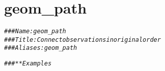 \documentclass[a4paper,titlepage]{tufte-handout}\usepackage[]{graphicx}\usepackage[]{color}
\makeatletter
\newcommand{\hlcom}[1]{\textcolor[rgb]{0.678,0.584,0.686}{\textit{#1}}}%
\newenvironment{kframe}{%
 \def\at@end@of@kframe{}%
 \ifinner\ifhmode%
  \def\at@end@of@kframe{\end{minipage}}%
  \begin{minipage}{\columnwidth}%
 \fi\fi%
 \def\FrameCommand##1{\hskip\@totalleftmargin \hskip-\fboxsep
 \colorbox{shadecolor}{##1}\hskip-\fboxsep
     \hskip-\linewidth \hskip-\@totalleftmargin \hskip\columnwidth}%
 \MakeFramed {\advance\hsize-\width
   \@totalleftmargin\z@ \linewidth\hsize
   \@setminipage}}%
 {\par\unskip\endMakeFramed%
 \at@end@of@kframe}
\newenvironment{knitrout}{}{} %
\makeatother
\begin{document}
\begin{knitrout}
\begin{kframe}
\begin{alltt}
\end{alltt}
\end{kframe}
\end{knitrout}



\section{geom\_path}

\begin{knitrout}
\color{fgcolor}\begin{kframe}
\begin{alltt}
\hlcom{### Name: geom_path}
\hlcom{### Title: Connect observations in original order}
\hlcom{### Aliases: geom_path}

\hlcom{### ** Examples}


\end{alltt}
\end{kframe}
\end{knitrout}
\end{document}
